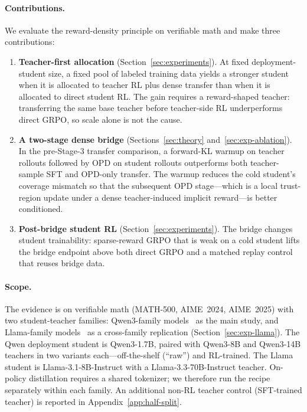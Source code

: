 \documentclass{article}
\begin{document}
\paragraph{Contributions.} We evaluate the reward-density principle on verifiable math and make three contributions:
\begin{enumerate}\setlength\itemsep{2pt}
\item \textbf{Teacher-first allocation} (Section~\ref{sec:experiments}). At fixed deployment-student size, a fixed pool of labeled training data yields a stronger student when it is allocated to teacher RL plus dense transfer than when it is allocated to direct student RL. The gain requires a reward-shaped teacher: transferring the same base teacher before teacher-side RL underperforms direct GRPO, so scale alone is not the cause.
\item \textbf{A two-stage dense bridge} (Sections~\ref{sec:theory} and~\ref{sec:exp-ablation}). In the pre-Stage-3 transfer comparison, a forward-KL warmup on teacher rollouts followed by OPD on student rollouts outperforms both teacher-sample SFT and OPD-only transfer. The warmup reduces the cold student's coverage mismatch so that the subsequent OPD stage---which is a local trust-region update under a dense teacher-induced implicit reward---is better conditioned.
\item \textbf{Post-bridge student RL} (Section~\ref{sec:experiments}). The bridge changes student trainability: sparse-reward GRPO that is weak on a cold student lifts the bridge endpoint above both direct GRPO and a matched replay control that reuses bridge data.
\end{enumerate}

\paragraph{Scope.} The evidence is on verifiable math (MATH-500, AIME~2024, AIME~2025) with two student-teacher families: Qwen3-family models~\citep{yang2025qwen3} as the main study, and Llama-family models~\citep{grattafiori2024llama} as a cross-family replication (Section~\ref{sec:exp-llama}). The Qwen deployment student is Qwen3-1.7B, paired with Qwen3-8B and Qwen3-14B teachers in two variants each---off-the-shelf (``raw'') and RL-trained. The Llama student is Llama-3.1-8B-Instruct with a Llama-3.3-70B-Instruct teacher. On-policy distillation requires a shared tokenizer; we therefore run the recipe separately within each family. An additional non-RL teacher control (SFT-trained teacher) is reported in Appendix~\ref{app:half-split}.
\end{document}
